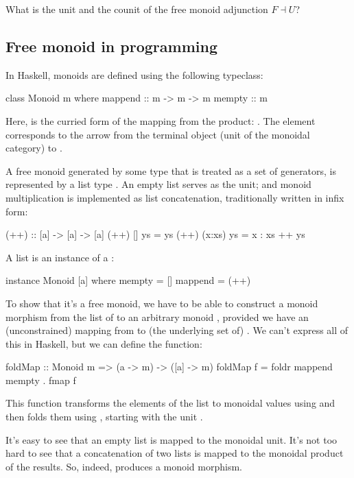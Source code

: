 \documentclass[DaoFP]{subfiles}
\begin{document}
\begin{exercise}
What is the unit and the counit of the free monoid adjunction $F \dashv U$?
\end{exercise}

\subsection{Free monoid in programming}

In Haskell, monoids are defined using the following typeclass:
\begin{haskell}
class Monoid m where
  mappend :: m -> m -> m
  mempty  :: m
\end{haskell}
Here,  is the curried form of the mapping from the product: . The  element corresponds to the arrow from the terminal object (unit of the monoidal category) to . 

A free monoid generated by some type  that is treated as a set of generators, is represented by a list type \hask{[a]}. An empty list serves as the unit; and monoid multiplication is implemented as list concatenation, traditionally written in infix form:
\begin{haskell}
(++) :: [a] -> [a] -> [a]
(++) []     ys = ys
(++) (x:xs) ys = x : xs ++ ys
\end{haskell}
A list is an instance of a :
\begin{haskell}
instance Monoid [a] where
  mempty = []
  mappend = (++)
\end{haskell}

To show that it's a free monoid, we have to be able to construct a monoid morphism from the list of  to an arbitrary monoid , provided we have an (unconstrained) mapping from  to (the underlying set of) . We can't express all of this in Haskell, but we can define the function:
\begin{haskell}
foldMap :: Monoid m => (a -> m) -> ([a] -> m)
foldMap f = foldr mappend mempty . fmap f
\end{haskell}
This function transforms the elements of the list to monoidal values using  and then folds them using , starting with the unit . 

It's easy to see that an empty list is mapped to the monoidal unit. It's not too hard to see that a concatenation of two lists is mapped to the monoidal product of the results. So, indeed,  produces a monoid morphism. 
\end{document}
